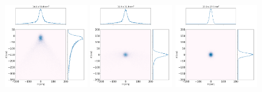 \documentclass[a4paper, 11pt]{article}
\begin{document}
\begin{figure}[h]
\centering
\includegraphics[width=0.32\textwidth]{figures/als_toroid.png}
\includegraphics[width=0.32\textwidth]{figures/als_parabolic-cone.png}
\includegraphics[width=0.32\textwidth]{figures/als_diaboloid.png}


\end{figure}
\end{document}
